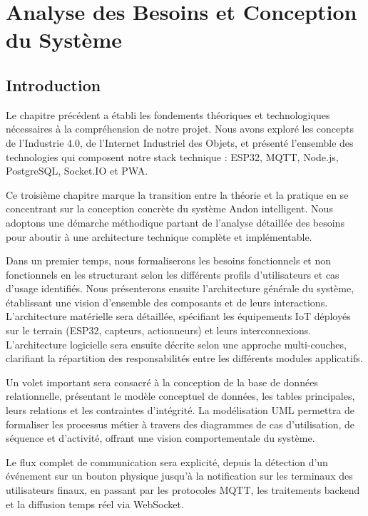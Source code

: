\chapter{Analyse des Besoins et Conception du Système}

\section*{Introduction}

Le chapitre précédent a établi les fondements théoriques et technologiques nécessaires à la compréhension de notre projet. Nous avons exploré les concepts de l'Industrie 4.0, de l'Internet Industriel des Objets, et présenté l'ensemble des technologies qui composent notre stack technique : ESP32, MQTT, Node.js, PostgreSQL, Socket.IO et PWA.

Ce troisième chapitre marque la transition entre la théorie et la pratique en se concentrant sur la conception concrète du système Andon intelligent. Nous adoptons une démarche méthodique partant de l'analyse détaillée des besoins pour aboutir à une architecture technique complète et implémentable.

Dans un premier temps, nous formaliserons les besoins fonctionnels et non fonctionnels en les structurant selon les différents profils d'utilisateurs et cas d'usage identifiés. Nous présenterons ensuite l'architecture générale du système, établissant une vision d'ensemble des composants et de leurs interactions. L'architecture matérielle sera détaillée, spécifiant les équipements IoT déployés sur le terrain (ESP32, capteurs, actionneurs) et leurs interconnexions. L'architecture logicielle sera ensuite décrite selon une approche multi-couches, clarifiant la répartition des responsabilités entre les différents modules applicatifs.

Un volet important sera consacré à la conception de la base de données relationnelle, présentant le modèle conceptuel de données, les tables principales, leurs relations et les contraintes d'intégrité. La modélisation UML permettra de formaliser les processus métier à travers des diagrammes de cas d'utilisation, de séquence et d'activité, offrant une vision comportementale du système.

Le flux complet de communication sera explicité, depuis la détection d'un événement sur un bouton physique jusqu'à la notification sur les terminaux des utilisateurs finaux, en passant par les protocoles MQTT, les traitements backend et la diffusion temps réel via WebSocket.

